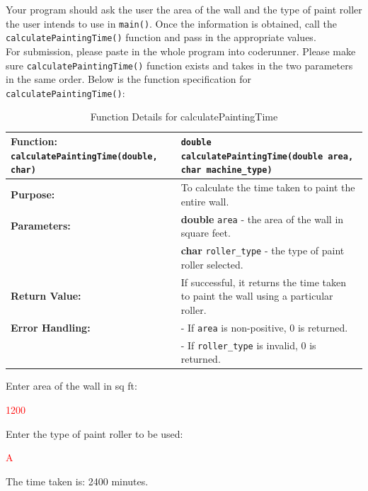 Your program should ask the user the area of the wall and the type of paint roller the user intends to use in  \texttt{main()}. Once the information is obtained, call the \texttt{calculatePaintingTime()} function and pass in the appropriate values. \\

For submission, please paste in the whole program into coderunner. Please make sure \texttt{calculatePaintingTime()} function exists and takes in the two parameters in the same order. Below is the function specification for \texttt{calculatePaintingTime()}:

\begin{table}[h!]
\centering
\begin{tabular}{|p{1.7in}|p{4.3in}|}
\hline
\textbf{Function:}  \texttt{calculatePaintingTime(double, char)} 
& \texttt{double calculatePaintingTime(double area, char machine\_type)} \\ \hline

\textbf{Purpose:} & To calculate the time taken to paint the entire wall. \\ \hline

\textbf{Parameters:} & 
\textbf{double} \texttt{area} - the area of the wall in square feet. \\
 & \textbf{char} \texttt{roller\_type} - the type of paint roller selected. \\ \hline

\textbf{Return Value:} & 
If successful, it returns the time taken to paint the wall using a particular roller. \\ \hline

\textbf{Error Handling:} & 
- If \texttt{area} is non-positive, 0 is returned. \\

& - If \texttt{roller\_type} is invalid, 0 is returned. \\ \hline


\end{tabular}
\caption{Function Details for calculatePaintingTime}
\end{table}

\begin{sample}
Enter area of the wall in sq ft:

 \textcolor{red}{1200}
 
Enter the type of paint roller to be used:

 \textcolor{red}{A}
 
The time taken is: 2400 minutes.

\end{sample}

